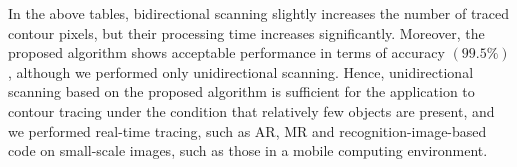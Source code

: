 \documentclass[sensors,article,accept,moreauthors,pdftex,10pt,a4paper]{mdpi}
\begin{document}



In the above tables, bidirectional scanning slightly increases the number of traced contour pixels, but their processing time increases significantly. Moreover, the proposed algorithm shows acceptable performance in terms of accuracy $(99.5\%)$, although we performed only unidirectional scanning. Hence, unidirectional scanning based on the proposed algorithm is sufficient for the application to contour tracing under the condition that relatively few objects are present, and we performed real-time tracing, such as AR, MR and recognition-image-based code on small-scale images, such as those in a mobile computing environment.

\end{document}
